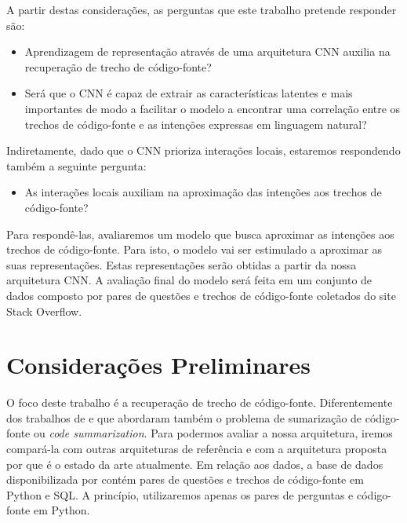 A partir destas considerações, as perguntas que este trabalho pretende responder são:

\begin{itemize}
    \item Aprendizagem de representação através de uma arquitetura CNN auxilia na recuperação de trecho de código-fonte?
    
    \item Será que o CNN é capaz de extrair as características latentes e mais importantes de modo a facilitar o modelo a encontrar uma correlação entre os trechos de código-fonte e as intenções expressas em linguagem natural?
\end{itemize}

Indiretamente, dado que o CNN prioriza interações locais, estaremos respondendo também a seguinte pergunta:
\begin{itemize}
        \item As interações locais auxiliam na aproximação das intenções aos trechos de código-fonte?
\end{itemize}

Para respondê-las, avaliaremos um modelo que busca aproximar as intenções aos trechos de código-fonte. Para isto, o modelo vai ser estimulado a aproximar as suas representações. Estas representações serão obtidas a partir da nossa arquitetura CNN. A avaliação final do modelo será feita em um conjunto de dados composto por pares de questões e trechos de código-fonte coletados do site Stack Overflow. 


\section{Considerações Preliminares}
\label{sec:consideracoes_preliminares}

O foco deste trabalho é a recuperação de trecho de código-fonte. Diferentemente dos trabalhos de \cite{iyer-etal-2016-summarizing} e \cite{Allamanis-bimodal-source-code-natural-language:2015} que abordaram também o problema de sumarização de código-fonte ou \textit{code summarization}. Para podermos avaliar a nossa arquitetura, iremos compará-la com outras arquiteturas de referência e com a arquitetura proposta por \cite{cambronero-deep-learning-code-search:2019} que é o estado da arte atualmente. Em relação aos dados, a base de dados disponibilizada por \cite{yao-2018} contém pares de questões e trechos de código-fonte em Python e SQL. A princípio, utilizaremos apenas os pares de perguntas e código-fonte em Python.


